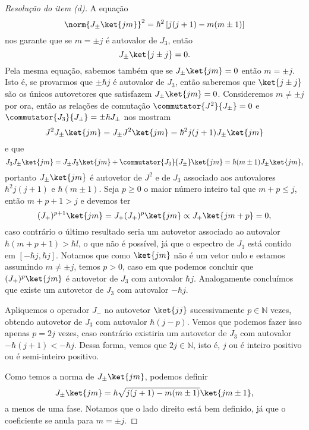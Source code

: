 \begin{proof}[Resolução do item (d)]
    A equação
    \begin{equation*}
        \norm{J_{\pm}\ket{jm}}^2 = \hbar^2\left[j(j+1) - m(m \pm 1)\right]
    \end{equation*}
    nos garante que se \(m = \pm j\) é autovalor de \(J_3\), então
    \begin{equation*}
        J_\pm \ket{j\pm j} = 0.
    \end{equation*}
    Pela mesma equação, sabemos também que se \(J_\pm\ket{jm} = 0\) então \(m = \pm j\). Isto é, se provarmos que \(\pm \hbar j\) é autovalor de \(J_3\), então saberemos que \(\ket{j \pm j}\) são os únicos autovetores que satisfazem \(J_\pm \ket{j m} = 0\). Consideremos \(m \neq \pm j\) por ora, então as relações de comutação \(\commutator{J^2}{J_\pm} = 0\) e \(\commutator{J_3}{J_\pm} = \pm \hbar J_\pm\) nos mostram
    \begin{equation*}
        J^2 J_\pm\ket{jm} = J_\pm J^2\ket{jm} = \hbar^2 j(j+1) J_\pm \ket{jm}
    \end{equation*}
    e que
    \begin{equation*}
        J_3 J_\pm \ket{jm} = J_\pm J_3 \ket{jm} + \commutator{J_3}{J_\pm}\ket{jm} = \hbar (m \pm 1) J_\pm\ket{jm},
    \end{equation*}
    portanto \(J_\pm \ket{jm}\) é autovetor de \(J^2\) e de \(J_3\) associado aos autovalores \(\hbar^2 j(j+1)\) e \(\hbar(m\pm 1)\). Seja \(p \geq 0\) o maior número inteiro tal que \(m + p \leq j\), então \(m + p + 1 > j\) e  devemos ter
    \begin{equation*}
        (J_+)^{p+1} \ket{jm} = J_+ (J_+)^p\ket{jm} \propto J_+ \ket{j m+p} = 0,
    \end{equation*}
    caso contrário o último resultado seria um autovetor associado ao autovalor \(\hbar (m + p + 1) > \hbar l\), o que não é possível, já que o espectro de \(J_3\) está contido em \([-\hbar j,\hbar j]\). Notamos que como \(\ket{jm}\) não é um vetor nulo e estamos assumindo \(m \neq \pm j\), temos \(p > 0\), caso em que podemos concluir que \((J_+)^p\ket{jm}\) é autovetor de \(J_3\) com autovalor \(\hbar j\). Analogamente concluímos que existe um autovetor de \(J_3\) com autovalor \(-\hbar j\).

    Apliquemos o operador \(J_-\) no autovetor \(\ket{jj}\) sucessivamente \(p \in \mathbb{N}\) vezes, obtendo autovetor de \(J_3\) com autovalor \(\hbar (j - p)\). Vemos que podemos fazer isso apenas \(p = 2j\) vezes, caso contrário existiria um autovetor de \(J_3\) com autovalor \(-\hbar(j+1) < -\hbar j\). Dessa forma, vemos que \(2j \in \mathbb{N}\), isto é, \(j\) ou é inteiro positivo ou é semi-inteiro positivo.

    Como temos a norma de \(J_\pm\ket{jm}\), podemos definir
    \begin{equation*}
        J_\pm\ket{jm} = \hbar\sqrt{j(j+1) - m(m\pm1)} \ket{jm\pm1},
    \end{equation*}
    a menos de uma fase. Notamos que o lado direito está bem definido, já que o coeficiente se anula para \(m = \pm j\).
\end{proof}
